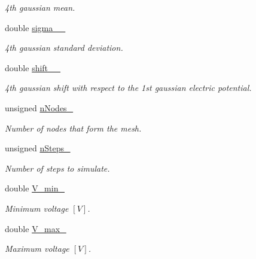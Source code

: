 \begin{DoxyCompactItemize}
\begin{DoxyCompactList}\small\item\em 4th gaussian mean. \end{DoxyCompactList}\item 
\hypertarget{classParamList_a8c6b6653287d435a1dce5f3ce3819352}{double \hyperlink{classParamList_a8c6b6653287d435a1dce5f3ce3819352}{sigma\-\_\-\_\-}}\label{classParamList_a8c6b6653287d435a1dce5f3ce3819352}

\begin{DoxyCompactList}\small\item\em 4th gaussian standard deviation. \end{DoxyCompactList}\item 
\hypertarget{classParamList_a966625893d78fcd3c8e989792b500617}{double \hyperlink{classParamList_a966625893d78fcd3c8e989792b500617}{shift\-\_\-\_\-}}\label{classParamList_a966625893d78fcd3c8e989792b500617}

\begin{DoxyCompactList}\small\item\em 4th gaussian shift with respect to the 1st gaussian electric potential. \end{DoxyCompactList}\item 
\hypertarget{classParamList_a8f4bb43717322579edc12974700aec98}{unsigned \hyperlink{classParamList_a8f4bb43717322579edc12974700aec98}{n\-Nodes\-\_\-}}\label{classParamList_a8f4bb43717322579edc12974700aec98}

\begin{DoxyCompactList}\small\item\em Number of nodes that form the mesh. \end{DoxyCompactList}\item 
\hypertarget{classParamList_af3118b388e4eb4a7ae9831c7aa947f84}{unsigned \hyperlink{classParamList_af3118b388e4eb4a7ae9831c7aa947f84}{n\-Steps\-\_\-}}\label{classParamList_af3118b388e4eb4a7ae9831c7aa947f84}

\begin{DoxyCompactList}\small\item\em Number of steps to simulate. \end{DoxyCompactList}\item 
\hypertarget{classParamList_ac4ae07e3255e2b3f4049da61d0b582ad}{double \hyperlink{classParamList_ac4ae07e3255e2b3f4049da61d0b582ad}{V\-\_\-min\-\_\-}}\label{classParamList_ac4ae07e3255e2b3f4049da61d0b582ad}

\begin{DoxyCompactList}\small\item\em Minimum voltage $ \left[ V \right] $. \end{DoxyCompactList}\item 
\hypertarget{classParamList_adfe385de93c027c018dbb12b622e9d26}{double \hyperlink{classParamList_adfe385de93c027c018dbb12b622e9d26}{V\-\_\-max\-\_\-}}\label{classParamList_adfe385de93c027c018dbb12b622e9d26}

\begin{DoxyCompactList}\small\item\em Maximum voltage $ \left[ V \right] $. \end{DoxyCompactList}\end{DoxyCompactItemize}
